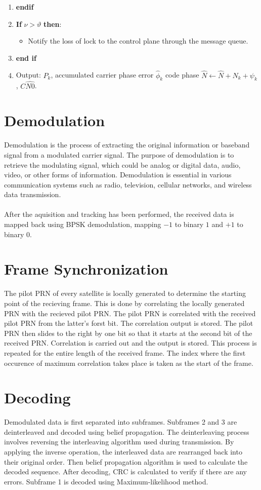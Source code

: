 \begin{enumerate}
\begin{itemize}
        \end{itemize}
    \item \textbf{endif}
    \item \textbf{If} $\nu > \vartheta$ \textbf{then}:
        \begin{itemize}
            \item Notify the loss of lock to the control plane through the message queue.
        \end{itemize}
    \item \textbf{end if} 
    \item Output: $P_k$, accumulated carrier phase error $\hat{\phi}_k$ code phase $\hat{N} \leftarrow \hat{N} + N_k + \psi_k$, $C\hat{N0}$.
     
\end{enumerate}
\section{Demodulation}
Demodulation is the process of extracting the original information or baseband signal from a modulated carrier signal. The purpose of demodulation is to retrieve the modulating signal, which could be analog or digital data, audio, video, or other forms of information. Demodulation is essential in various communication systems such as radio, television, cellular networks, and wireless data transmission.
\\
\\
After the aquisition and tracking has been performed, the received data is mapped back using BPSK demodulation, mapping $-1$ to binary $1$ and $+1$ to binary $0$.
\section{Frame Synchronization}
The pilot PRN of every satellite is locally generated to determine the starting point of the recieving frame. This is done by correlating the locally generated PRN with the recieved pilot PRN. The pilot PRN is correlated with the received pilot PRN from the latter's forst bit. The correlation output is stored. The pilot PRN then slides to the right by one bit so that it starts at the second bit of the received PRN. Correlation is carried out and the output is stored. This process is repeated for the entire length of the received frame. The index where the first occurence of maximum correlation takes place is taken as the start of the frame.
\section{Decoding}
Demodulated data is first separated into subframes. Subframes 2 and 3 are deinterleaved and decoded using belief propagation. The deinterleaving process involves reversing the interleaving algorithm used during transmission. By applying the inverse operation, the interleaved data are rearranged back into their original order. Then belief propagation algorithm is used to calculate the decoded sequence. After decoding, CRC is calculated to verify if there are any errors. Subframe 1 is decoded using Maximum-likelihood method.
